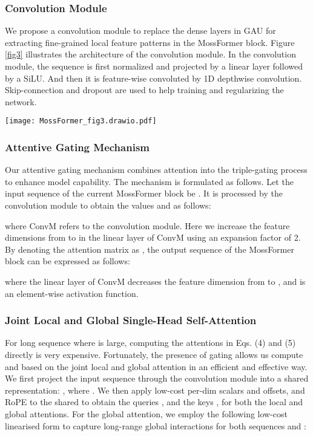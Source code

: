 \documentclass[9pt]{extarticle}
\begin{document}
\subsubsection{Convolution Module}
We propose a convolution module to replace the dense layers in GAU for extracting fine-grained local feature patterns in the MossFormer block. Figure \ref{fig3} illustrates the architecture of the convolution module. In the convolution module, the sequence is first normalized and projected by a linear layer followed by a SiLU. And then it is feature-wise convoluted by 1D depthwise convolution.  Skip-connection and dropout are used to help training and regularizing the network. 
\begin{figure*}[t]
  \centering
  \texttt{[image: MossFormer\_fig3.drawio.pdf]}
  \caption{Convolution module. It contains a linear layer with an expansion factor followed by a SiLU activation layer, and then followed by a 1-D depthwise convolution layer with a skip connection.}
  \label{fig3}
\end{figure*} 
\subsubsection{Attentive Gating Mechanism} 
Our attentive gating mechanism combines attention into the triple-gating process to enhance model capability. The mechanism is formulated as follows. Let the input sequence of the current MossFormer block be . It is processed by the convolution module to obtain the values  and  as follows:

where ConvM refers to the convolution module. Here we increase the feature dimensions from  to  in the linear layer of ConvM using an expansion factor of 2. By denoting the attention matrix as , the output sequence  of the MossFormer block can be expressed as follows:

where the linear layer of ConvM decreases the feature dimension from  to , and  is an element-wise activation function. 
\subsubsection{Joint Local and Global Single-Head Self-Attention} 
For long sequence where  is large, computing the attentions in Eqs. (4) and (5)
directly is very expensive. Fortunately, the presence of gating allows us 
compute  and  based on the joint local and global attention in an efficient and effective way. 
We first project the input sequence  through the convolution module into a shared representation: , where . We then apply low-cost per-dim scalars and offsets, and  RoPE \cite{Su2021Y} to the shared  to obtain the queries ,  and the keys ,  for both the local  and  global attentions. For the global attention, we employ the following low-cost linearised form to capture long-range global interactions for both sequences  and :
\end{document}
